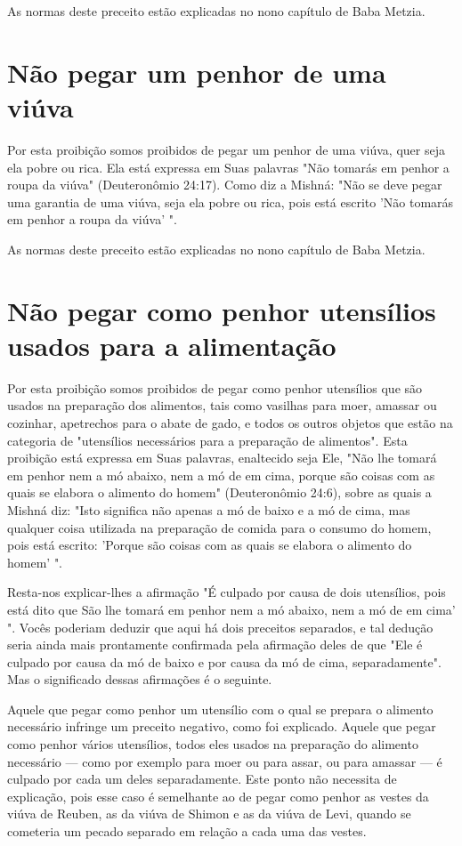 \begin{itemize}
\begin{enumrate}
\begin{itemize}
\begin{itemize}
\begin{itemize}
As normas deste preceito estão explicadas no nono capítulo de Baba
Metzia.

\section{Não pegar um penhor de uma viúva}

Por esta proibição somos proibidos de pegar um penhor de uma viú­va,
quer seja ela pobre ou rica. Ela está expressa em Suas palavras "Não
tomarás em penhor a roupa da viúva" (Deuteronômio 24:17). Como diz a
Mishná: "Não se deve pegar uma garantia de uma viúva, seja ela pobre ou
rica, pois está escri­to 'Não tomarás em penhor a roupa da viúva' ".

As normas deste preceito estão explicadas no nono capítulo de Baba
Metzia.

\section{Não pegar como penhor utensílios usados para a alimentação}

Por esta proibição somos proibidos de pegar como penhor utensí­lios que
são usados na preparação dos alimentos, tais como vasilhas para moer,
amassar ou cozinhar, apetrechos para o abate de gado, e todos os outros
obje­tos que estão na categoria de "utensílios necessários para a
preparação de ali­mentos". Esta proibição está expressa em Suas
palavras, enaltecido seja Ele, "Não lhe tomará em penhor nem a mó
abaixo, nem a mó de em cima, porque são coisas com as quais se elabora o
alimento do homem" (Deuteronômio 24:6), sobre as quais a Mishná diz:
"Isto significa não apenas a mó de baixo e a mó de cima, mas qualquer
coisa utilizada na preparação de comida para o consu­mo do homem, pois
está escrito: 'Porque são coisas com as quais se elabora o alimento do
homem' ".

Resta-nos explicar-lhes a afirmação "É culpado por causa de dois
uten­sílios, pois está dito que São lhe tomará em penhor nem a mó
abaixo, nem a mó de em cima' ". Vocês poderiam deduzir que aqui há dois
preceitos sepa­rados, e tal dedução seria ainda mais prontamente
confirmada pela afirmação deles de que "Ele é culpado por causa da mó de
baixo e por causa da mó de cima, separadamente". Mas o significado
dessas afirmações é o seguinte.

Aquele que pegar como penhor um utensílio com o qual se prepara o
alimento necessário infringe um preceito negativo, como foi explicado.
Aque­le que pegar como penhor vários utensílios, todos eles usados na
preparação do alimento necessário --- como por exemplo para moer ou para
assar, ou para amassar --- é culpado por cada um deles separadamente.
Este ponto não necessita de explicação, pois esse caso é semelhante ao
de pegar como pe­nhor as vestes da viúva de Reuben, as da viúva de
Shimon e as da viúva de Levi, quando se cometeria um pecado separado em
relação a cada uma das vestes.


\end{itemize}
\end{itemize}
\end{itemize}
\end{enumrate}
\end{itemize}

